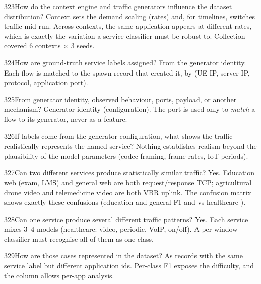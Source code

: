 \begin{qa}{323}{How do the context engine and traffic generators influence the dataset distribution?}
Context sets the demand scaling (rates) and, for timelines, switches traffic mid-run. Across contexts, the same
application appears at different rates, which is exactly the variation a service classifier must be robust to.
Collection covered 6 contexts $\times$ 3 seeds.
\end{qa}

\begin{qa}{324}{How are ground-truth service labels assigned?}
From the generator identity. Each flow is matched to the spawn record that created it, by (UE IP, server IP,
protocol, application port).
\end{qa}

\begin{qa}{325}{From generator identity, observed behaviour, ports, payload, or another mechanism?}
Generator identity (configuration). The port is used only to \emph{match} a flow to its generator, never as a
feature.
\end{qa}

\begin{qa}{326}{If labels come from the generator configuration, what shows the traffic realistically represents the named service?}
Nothing establishes realism beyond the plausibility of the model parameters (codec framing, frame rates, IoT
periods).
\end{qa}

\begin{qa}{327}{Can two different services produce statistically similar traffic?}
Yes. Education web (exam, LMS) and general web are both request/response TCP; agricultural drone video and
telemedicine video are both VBR uplink. The confusion matrix shows exactly these confusions (education and general F1
\NSnRfEducation{} and \NSnRfGeneral{} vs healthcare \NSnRfHealthcare).
\end{qa}

\begin{qa}{328}{Can one service produce several different traffic patterns?}
Yes. Each service mixes 3--4 models (healthcare: video, periodic, VoIP, on/off). A per-window classifier must recognise
all of them as one class.
\end{qa}

\begin{qa}{329}{How are those cases represented in the dataset?}
As records with the same service label but different application ids. Per-class F1 exposes the difficulty, and the
 column allows per-app analysis.
\end{qa}

